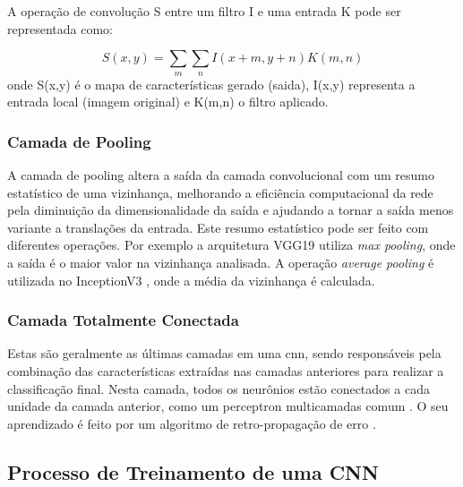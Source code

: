 A operação de convolução S entre um filtro I e uma entrada K pode ser representada como:

\begin{equation}
    \label{eqn:convolution}
    S(x,y) = \sum_{m}\sum_{n}I(x+m,y+n)K(m,n)
\end{equation}
onde S(x,y) é o mapa de características gerado (saida), I(x,y) representa a entrada local (imagem original) e K(m,n) o filtro aplicado.
\subsubsection{Camada de Pooling}


A camada de pooling altera a saída da camada convolucional com um resumo estatístico de uma vizinhança, melhorando a eficiência computacional da rede pela diminuição da dimensionalidade da saída e ajudando a tornar a saída menos variante a translações da entrada.
Este resumo estatístico pode ser feito com diferentes operações. Por exemplo a arquitetura VGG19 \cite{vgg} utiliza \textit{max pooling}, onde a saída é o maior valor na vizinhança analisada. A operação \textit{average pooling} é utilizada no InceptionV3 \cite{inceptionv3}, onde a média da vizinhança é calculada.


\subsubsection{Camada Totalmente Conectada}

Estas são geralmente as últimas camadas em uma \acrshort{cnn}, sendo responsáveis pela combinação das características extraídas nas camadas anteriores para realizar a classificação final. 
Nesta camada, todos os neurônios estão conectados a cada unidade da camada anterior, como um perceptron multicamadas comum \cite{MURTAGH1991183}. 
O seu aprendizado é feito por um algoritmo de retro-propagação de erro \cite{Rumelhart1986LearningRB}.
\subsection{Processo de Treinamento de uma CNN}

